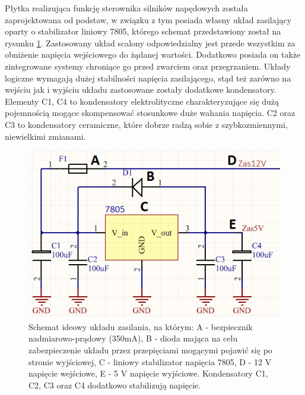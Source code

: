 Płytka realizująca funkcję sterownika silników napędowych została zaprojektowana od podstaw, w związku z tym posiada własny układ zasilający oparty o stabilizator liniowy 7805, którego schemat przedstawiony został na rysunku \ref{zas_at}. Zastosowany układ scalony odpowiedzialny jest przede wszystkim za obniżenie napięcia wejściowego do żądanej wartości. Dodatkowo posiada on także zintegrowane systemy chroniące go przed zwarciem oraz przegrzaniem. Układy logiczne wymagają dużej stabilności napięcia zasilającego, stąd też zarówno na wejściu jak i wyjściu układu zastosowane zostały dodatkowe kondensatory. Elementy C1, C4 to kondensatory elektrolityczne charakteryzujące się dużą pojemnością mogące skompensować stosunkowe duże wahania napięcia. C2 oraz C3 to kondensatory ceramiczne, które dobrze radzą sobie z szybkozmiennymi, niewielkimi zmianami.

  \begin{figure}[H]
    \begin{center}
      \includegraphics[scale=0.55]{imgs/zasilanie_atmeg.png}
 	\caption[Zasilanie sterownika silników.]{\small{Schemat ideowy układu zasilania, na którym: A - bezpiecznik nadmiarowo-prądowy (350mA), B - dioda mająca na celu zabezpieczenie układu przez przepięciami mogącymi pojawić się po stronie wyjściowej, C - liniowy stabilizator napięcia 7805, D - 12 V napięcie wejściowe, E - 5 V napięcie wyjściowe. Kondensatory C1, C2, C3 oraz C4 dodatkowo stabilizują napięcie.}}
	\label{zas_at}
    \end{center}
  \end{figure}  
  

